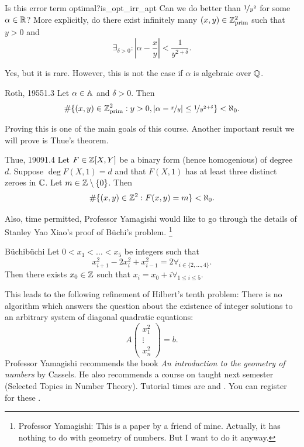 \documentclass{Vorlesungstemplate_English} %
\begin{document}
\begin{question}{Is this error term optimal?}{is_opt_irr_apt}
  Can we do better than $\nicefrac{1}{y^2}$ for some $\alpha \in \R$? More explicitly, do there exist infinitely many $(x,y) \in \Zprim{2}$ such that $y > 0$ and
  \[ \exists_{\delta > 0}:\left| \alpha - \frac{x}{y}\right| < \frac{1}{y^{2+\delta}}.\]
\end{question}
\begin{answertoquestion} Yes, but it is rare. However, this is not the case if $\alpha$ is algebraic over $\Q$.
\end{answertoquestion}
  \begin{theorem}{Roth, 1955}{1.3}
    Let $\alpha \in \AA$ and $\delta > 0$. Then
    \[ \#\{ (x,y) \in \Zprim{2}: y > 0, |\alpha-\nicefrac{x}{y}| \leq \nicefrac{1}{y^{2+\delta}}\} < \aleph_0.\]
  \end{theorem}
  \noindent Proving this is one of the main goals of this course. Another important result we will prove is Thue's theorem.
  \begin{theorem}{Thue, 1909}{1.4}
    Let $F \in \Z[X,Y]$ be a binary form (hence homogenious) of degree $d$. Suppose $\deg F(X,1) = d$ and that $F(X,1)$ has at least three distinct zeroes in $\C$. Let $m \in \Z \setminus \{ 0\}$. Then
    \[ \#\{ (x,y) \in \Z^2: F(x,y) = m\} < \aleph_0.\]
  \end{theorem}
  \noindent Also, time permitted, Professor Yamagishi would like to go through the details of Stanley Yao Xiao's proof of Büchi's problem. \footnote{Professor Yamagishi: This is a paper by a friend of mine. Actually, it has nothing to do with geometry of numbers. But I want to do it anyway.}
  \begin{problem}{Büchi}{büchi} Let $0 < x_1 < \dots < x_5$ be integers such that
  \[ x_{i+1}^2-2x_i^2 + x_{i-1}^2 = 2 \forall_{i \in \{ 2, \dots, 4\}}.\]
  Then there exists $x_0 \in \Z$ such that $x_i = x_0+i \forall_{1 \leq i \leq 5}$.
  \end{problem}
  \noindent This leads to the following refinement of Hilbert's tenth problem:
  There is no algorithm which answers the question about the existence of integer solutions to an arbitrary system of diagonal quadratic equations:
  \[ A\begin{pmatrix}
    x_1^2 \\
    \vdots \\
    x_n^2
  \end{pmatrix} = b.\]
 Professor Yamagishi recommends the book \emph{An introduction to the geometry of numbers}\autocite{cas97} by Cassels. He also recommends a course on  taught next semester (Selected Topics in Number Theory). Tutorial times are  and . You can register for these .
\end{document}

